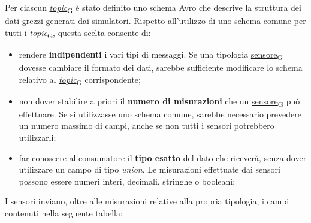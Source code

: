 Per ciascun \href{https://7last.github.io/docs/pb/documentazione-interna/glossario\#topic}{\textit{topic}\textsubscript{G}} è stato definito uno schema Avro che descrive la struttura dei dati grezzi generati dai simulatori. Rispetto all'utilizzo di uno schema comune per tutti i \href{https://7last.github.io/docs/pb/documentazione-interna/glossario\#topic}{\textit{topic}\textsubscript{G}},
questa scelta consente di:
\begin{itemize}
	\item rendere \textbf{indipendenti} i vari tipi di messaggi. Se una tipologia \href{https://7last.github.io/docs/pb/documentazione-interna/glossario\#sensore}{sensore\textsubscript{G}} dovesse cambiare il formato dei dati, sarebbe sufficiente modificare lo schema relativo al \href{https://7last.github.io/docs/pb/documentazione-interna/glossario\#topic}{\textit{topic}\textsubscript{G}} corrispondente;
	\item non dover stabilire a priori il \textbf{numero di misurazioni} che un \href{https://7last.github.io/docs/pb/documentazione-interna/glossario\#sensore}{sensore\textsubscript{G}} può effettuare. Se si utilizzasse uno schema comune, sarebbe necessario prevedere un numero massimo di campi, anche se non tutti i sensori potrebbero utilizzarli;
	\item far conoscere al consumatore il \textbf{tipo esatto} del dato che riceverà, senza dover utilizzare un campo di tipo \textit{union}. Le misurazioni effettuate dai sensori possono essere numeri interi, decimali, stringhe o booleani;
\end{itemize}
\pagebreak
I sensori inviano, oltre alle misurazioni relative alla propria tipologia, i campi contenuti nella seguente tabella:
